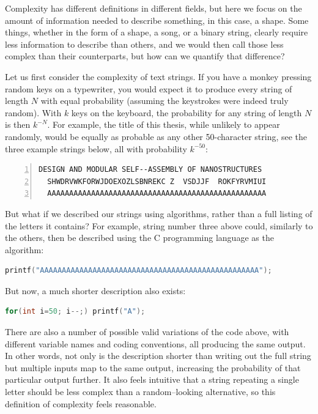 Complexity has different definitions in different fields, but here we focus on the amount of information needed to describe something, in this case, a shape. Some things, whether in the form of a shape, a song, or a binary string, clearly require less information to describe than others, and we would then call those less complex than their counterparts, but how can we quantify that difference?

Let us first consider the complexity of text strings. If you have a monkey pressing random keys on a typewriter, you would expect it to produce every string of length \(N\) with equal probability (assuming the keystrokes were indeed truly random). With \(k\) keys on the keyboard, the probability for any string of length \(N\) is then \(k^{-N}\). For example, the title of this thesis, while unlikely to appear randomly, would be equally as probable as any other 50-character string, see the three example strings below, all with probability \(k^{-50}\):
\begin{lstlisting}[numbers=left]
  DESIGN AND MODULAR SELF--ASSEMBLY OF NANOSTRUCTURES
  SHWDRVWKFORWJDOEXOZLSBNREKC Z  VSDJJF  ROKFYRVMIUI
  AAAAAAAAAAAAAAAAAAAAAAAAAAAAAAAAAAAAAAAAAAAAAAAAAA
\end{lstlisting}

But what if we described our strings using algorithms, rather than a full listing of the letters it contains? For example, string number three above could, similarly to the others, then be described using the C programming language as the algorithm:

\begin{lstlisting}[language=c]
printf("AAAAAAAAAAAAAAAAAAAAAAAAAAAAAAAAAAAAAAAAAAAAAAAAAA");
\end{lstlisting}

But now, a much shorter description also exists:

\begin{lstlisting}[language=c]
for(int i=50; i--;) printf("A");
\end{lstlisting}

There are also a number of possible valid variations of the code above, with different variable names and coding conventions, all producing the same output. In other words, not only is the description shorter than writing out the full string but multiple inputs map to the same output, increasing the probability of that particular output further. It also feels intuitive that a string repeating a single letter should be less complex than a random--looking alternative, so this definition of complexity feels reasonable.

